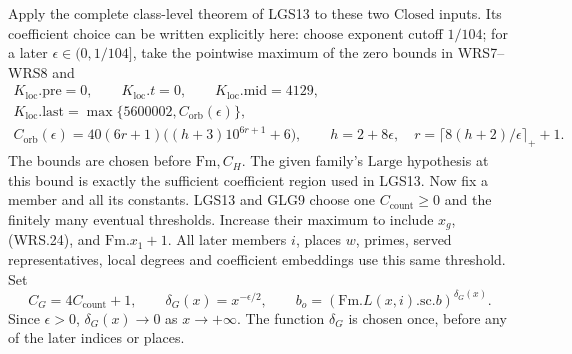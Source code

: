 Apply the complete class-level theorem of LGS13 to these two
\(\mathrm{Closed}\) inputs.  Its coefficient choice can be
written explicitly here: choose exponent cutoff \(1/104\);
for a later \(\epsilon\in(0,1/104]\), take the pointwise maximum
of the zero bounds in WRS7--WRS8 and
\[
 \begin{gathered}
 K_{\mathrm{loc}}.\mathrm{pre}=0,\qquad
 K_{\mathrm{loc}}.t=0,\qquad
 K_{\mathrm{loc}}.\mathrm{mid}=4129,\\
 K_{\mathrm{loc}}.\mathrm{last}
     =\max\{5600002,C_{\mathrm{orb}}(\epsilon)\},\\
 C_{\mathrm{orb}}(\epsilon)
   =40(6r+1)\bigl((h+3)10^{6r+1}+6\bigr),\qquad
 h=2+8\epsilon,\quad r=\lceil8(h+2)/\epsilon\rceil_++1.
 \end{gathered}                                                   \tag{WRS.26}
\]
The bounds are chosen before \(\mathrm{Fm},C_H\).
The given family's \(\mathrm{Large}\) hypothesis at this
bound is exactly the sufficient coefficient region used in LGS13.
Now fix a member and all its constants.  LGS13 and GLG9 choose
one \(C_{\mathrm{count}}\ge0\) and the finitely many eventual
thresholds.  Increase their maximum to include
\(x_g\), (WRS.24), and \(\mathrm{Fm}.x_1+1\).  All later
members \(i\), places \(w\), primes, served representatives,
local degrees and coefficient embeddings use this same threshold.
Set
\[
 C_G=4C_{\mathrm{count}}+1,\qquad
 \delta_G(x)=x^{-\epsilon/2},\qquad
 b_o=(\mathrm{Fm}.L(x,i).\mathrm{sc}.b)^{\delta_G(x)}.
 \tag{WRS.27}
\]
Since \(\epsilon>0\), \(\delta_G(x)\to0\) as \(x\to+\infty\).
The function \(\delta_G\) is chosen once, before any of the
later indices or places.

